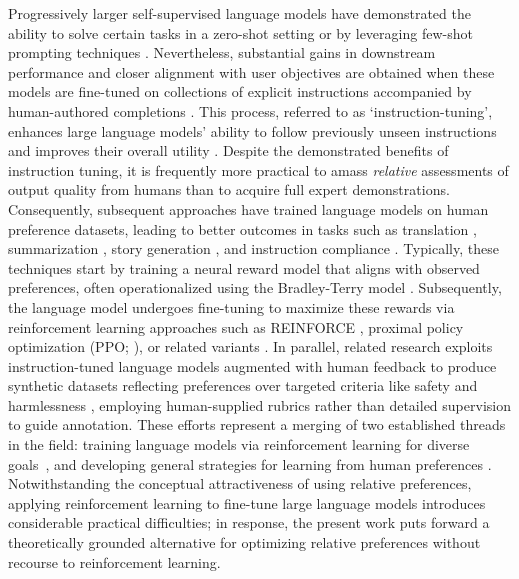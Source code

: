 Progressively larger self-supervised language models have demonstrated the ability to solve certain tasks in a zero-shot setting \citep{radford2019language} or by leveraging few-shot prompting techniques \citep{gpt3,megatron,chowdhery2022palm}. Nevertheless, substantial gains in downstream performance and closer alignment with user objectives are obtained when these models are fine-tuned on collections of explicit instructions accompanied by human-authored completions \citep{mishra-etal-2022-cross,sanh2022multitask,chung2022scaling,thoppilan2022lamda}. This process, referred to as `instruction-tuning', enhances large language models’ ability to follow previously unseen instructions and improves their overall utility \citep{chung2022scaling}. Despite the demonstrated benefits of instruction tuning, it is frequently more practical to amass \textit{relative} assessments of output quality from humans than to acquire full expert demonstrations. Consequently, subsequent approaches have trained language models on human preference datasets, leading to better outcomes in tasks such as translation \citep{kreutzer-etal-2018-reliability}, summarization \citep{stiennon2022learning,ziegler2020finetuning}, story generation \citep{ziegler2020finetuning}, and instruction compliance \citep{ouyang2022training,ramamurthy2023is}. Typically, these techniques start by training a neural reward model that aligns with observed preferences, often operationalized using the Bradley-Terry model \citep{bradley1952rankanalysis}. Subsequently, the language model undergoes fine-tuning to maximize these rewards via reinforcement learning approaches such as REINFORCE \citep{williams1992reinforce}, proximal policy optimization (PPO; \cite{schulman2017proximal}), or related variants \citep{ramamurthy2023is}. In parallel, related research exploits instruction-tuned language models augmented with human feedback to produce synthetic datasets reflecting preferences over targeted criteria like safety and harmlessness \citep{bai2022constitutional}, employing human-supplied rubrics rather than detailed supervision to guide annotation. These efforts represent a merging of two established threads in the field: training language models via reinforcement learning for diverse goals~\citep{Ranzato2015SequenceLT,paulus2018a,wu2018learning}, and developing general strategies for learning from human preferences \citep{christiano2017deep,kupcsik2018learning}. Notwithstanding the conceptual attractiveness of using relative preferences, applying reinforcement learning to fine-tune large language models introduces considerable practical difficulties; in response, the present work puts forward a theoretically grounded alternative for optimizing relative preferences without recourse to reinforcement learning.

